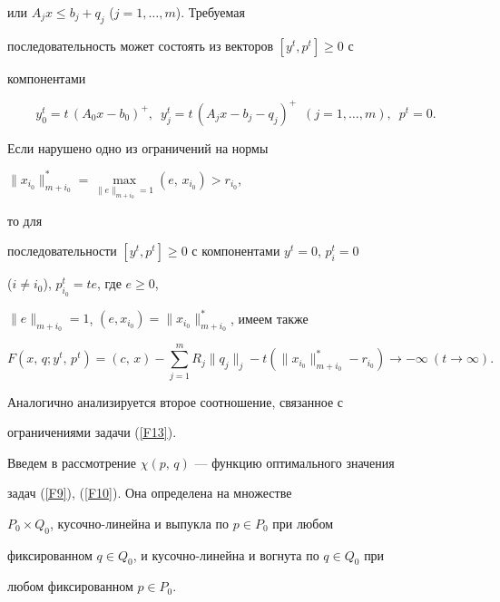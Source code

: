 \begin{pf}
или $A_jx\le b_j+q_j$ ($j=1,\dotsc,m$). Требуемая


последовательность может состоять из векторов $[y^t,p^t]\ge 0$ с


компонентами


$$


y^t_0=t\,(A_0x-b_0)^+,\ \; y^t_j=t\,(A_jx-b_j-q_j)^+


\ \;(j=1,\dotsc,m),\ \; p^t=0.


$$


Если нарушено одно из ограничений на нормы


$\|x_{i_0}\|^*_{m+i_0}=\max\limits_{\|e\|_{m+i_0}=1}(e,\,x_{i_0})>r_{i_0}$,


то для


последовательности $[y^t,p^t]\ge 0$ с компонентами $y^t=0$, $p^t_i=0$


($i\ne i_0$), $p^t_{i_0}=te$, где $e\ge 0$,


$\|e\|_{m+i_0}=1$, $(e,x_{i_0})=\|x_{i_0}\|^*_{m+i_0}$, имеем также


$$


F(x,\,q; y^t,\,p^t)=(c,\,x)-\sum^m_{j=1}R_j\| q_j\|_j -t(\|


x_{i_0}\|^*_{m+i_0} -r_{i_0}) \to-\infty\ (t\to\infty).


$$


Аналогично анализируется второе соотношение, связанное с


ограничениями задачи (\ref{F13}).


\end{pf}





Введем в рассмотрение $\chi(p,\,q)$ --- функцию оптимального значения


задач (\ref{F9}), (\ref{F10}). Она определена на множестве


$P_0\times Q_0$, кусочно-линейна и выпукла по $p\in P_0$ при любом


фиксированном $q\in Q_0$, и кусочно-линейна и вогнута по $q\in Q_0$ при


любом фиксированном $p\in P_0$.





